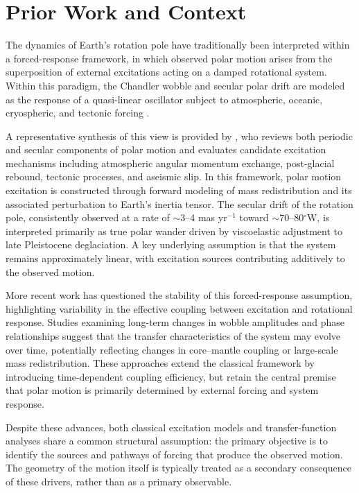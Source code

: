 \documentclass[twocolumn,9pt]{revtex4-2}
\begin{document}
\section{Prior Work and Context}
\label{sec:prior_work_and_context}

The dynamics of Earth’s rotation pole have traditionally been interpreted within a forced-response framework, in which observed polar motion arises from the superposition of external excitations acting on a damped rotational system. Within this paradigm, the Chandler wobble and secular polar drift are modeled as the response of a quasi-linear oscillator subject to atmospheric, oceanic, cryospheric, and tectonic forcing \citep{gross2007}.

A representative synthesis of this view is provided by \citet{dickman2000}, who reviews both periodic and secular components of polar motion and evaluates candidate excitation mechanisms including atmospheric angular momentum exchange, post-glacial rebound, tectonic processes, and aseismic slip. In this framework, polar motion excitation is constructed through forward modeling of mass redistribution and its associated perturbation to Earth’s inertia tensor. The secular drift of the rotation pole, consistently observed at a rate of $\sim$3--4 mas yr$^{-1}$ toward $\sim$70--80$^\circ$W, is interpreted primarily as true polar wander driven by viscoelastic adjustment to late Pleistocene deglaciation. A key underlying assumption is that the system remains approximately linear, with excitation sources contributing additively to the observed motion.

More recent work has questioned the stability of this forced-response assumption, highlighting variability in the effective coupling between excitation and rotational response. Studies examining long-term changes in wobble amplitudes and phase relationships suggest that the transfer characteristics of the system may evolve over time, potentially reflecting changes in core--mantle coupling or large-scale mass redistribution. These approaches extend the classical framework by introducing time-dependent coupling efficiency, but retain the central premise that polar motion is primarily determined by external forcing and system response.

Despite these advances, both classical excitation models and transfer-function analyses share a common structural assumption: the primary objective is to identify the sources and pathways of forcing that produce the observed motion. The geometry of the motion itself is typically treated as a secondary consequence of these drivers, rather than as a primary observable.
\end{document}
